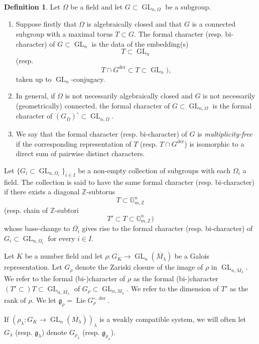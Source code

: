\documentclass{amsart}
\theoremstyle{definition}
\newtheorem{definition}[theorem]{Definition}
\numberwithin{equation}{section} %
\newcommand{\GL}{\operatorname{GL}}
\newcommand{\Lie}{\operatorname{Lie}}
\newcommand{\der}{\operatorname{der}}
\newcommand{\bb}[1]{\mathbb{#1}}
\newcommand{\mf}[1]{\mathfrak{#1}}
\newcommand{\ol}[1]{\overline{#1}}
\begin{document}
\begin{definition}
Let $\Omega$ be a field and let $G \subset \GL_{n,\Omega}$ be a subgroup.
\begin{enumerate}
    \item Suppose firstly that $\Omega$ is algebraically closed and that $G$ is a connected subgroup with a maximal torus $T \subset G$.
The formal character (resp. bi-character) of $G \subset \GL_n$ is the data of the embedding(s) \[T \subset \GL_n\] (resp. \[T \cap G^{\der} \subset T \subset \GL_n),\] taken up to $\GL_n$-conjugacy.
\item In general, if $\Omega$ is not necessarily algebraically closed and $G$ is not necessarily (geometrically) connected, the formal character of $G \subset \GL_{n,\Omega}$ is the formal character of $(G_{\ol{\Omega}})^\circ \subset \GL_{n,\ol{\Omega}}$.
\item We say that the formal character (resp. bi-character) of $G$ is \emph{multiplicity-free} if the corresponding representation of $T$ (resp. $T \cap G^{\der}$) is isomorphic to a direct sum of pairwise distinct characters.
\end{enumerate}
\end{definition}

Let $\{G_i \subset \GL_{n,\Omega_i}\}_{i \in I}$ be a non-empty collection of subgroups with each $\Omega_i$ a field.
The collection is said to have the same formal character (resp. bi-character) if there exists a diagonal $\bb{Z}$-subtorus \[T \subset \bb{G}_{m,\bb{Z}}^n\] (resp. chain of $\bb{Z}$-subtori \[T' \subset T \subset \bb{G}_{m,\bb{Z}}^n )\] whose base-change to $\ol{\Omega_i}$ gives rise to the formal character (resp. bi-character) of $G_i \subset \GL_{n,\Omega_i}$ for every $i \in I$.

Let $K$ be a number field and let $\rho: G_K \to \GL_n(\ol{M_\lambda})$ be a Galois representation.
Let $G_\rho$ denote the Zariski closure of the image of $\rho$ in \( \GL_{n,\ol{M_\lambda}} \).
We refer to the formal (bi-)character of $\rho$ as the formal (bi-)character $(T' \subset) T \subset \GL_{n,\ol{M_\lambda}}$ of $G_\rho \subset \GL_{n,M_\lambda}$.
We refer to the dimension of $T'$ as the rank of $\rho$.
We let $\mf{g}_\rho = \Lie G_\rho^{\circ, \der}$.

If $(\rho_\lambda: G_K \to \GL_n(\ol{M_\lambda}))_\lambda$ is a weakly compatible system, we will often let $G_\lambda$ (resp. $\mf{g}_\lambda$) denote $G_{\rho_\lambda}$ (resp. $\mf{g}_{\rho_\lambda}$).
\end{document}
